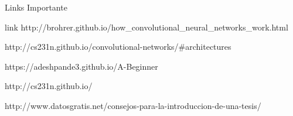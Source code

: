 Links Importante

link http://brohrer.github.io/how_convolutional_neural_networks_work.html

http://cs231n.github.io/convolutional-networks/#architectures

https://adeshpande3.github.io/A-Beginner%

http://cs231n.github.io/

http://www.datosgratis.net/consejos-para-la-introduccion-de-una-tesis/